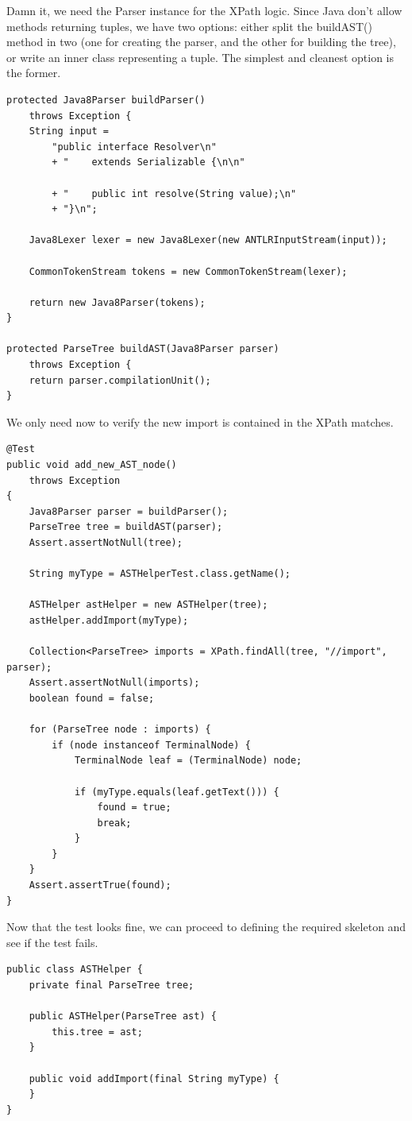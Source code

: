 \documentclass[11pt]{article}
\begin{document}
Damn it, we need the Parser instance for the XPath logic. Since Java don't allow methods returning tuples, we have two options: either split
the buildAST() method in two (one for creating the parser, and the other for building the tree), or write an inner class representing a tuple.
The simplest and cleanest option is the former.

\begin{verbatim}
protected Java8Parser buildParser()
    throws Exception {
    String input =
        "public interface Resolver\n"
        + "    extends Serializable {\n\n"

        + "    public int resolve(String value);\n"
        + "}\n";

    Java8Lexer lexer = new Java8Lexer(new ANTLRInputStream(input));

    CommonTokenStream tokens = new CommonTokenStream(lexer);

    return new Java8Parser(tokens);
}

protected ParseTree buildAST(Java8Parser parser)
    throws Exception {
    return parser.compilationUnit();
}
\end{verbatim}

We only need now to verify the new import is contained in the XPath matches.

\begin{verbatim}
@Test
public void add_new_AST_node()
    throws Exception
{
    Java8Parser parser = buildParser();
    ParseTree tree = buildAST(parser);
    Assert.assertNotNull(tree);

    String myType = ASTHelperTest.class.getName();

    ASTHelper astHelper = new ASTHelper(tree);
    astHelper.addImport(myType);

    Collection<ParseTree> imports = XPath.findAll(tree, "//import", parser);
    Assert.assertNotNull(imports);
    boolean found = false;

    for (ParseTree node : imports) {
        if (node instanceof TerminalNode) {
            TerminalNode leaf = (TerminalNode) node;

            if (myType.equals(leaf.getText())) {
                found = true;
                break;
            }
        }
    }
    Assert.assertTrue(found);
}
\end{verbatim}

Now that the test looks fine, we can proceed to defining the required skeleton and see if the test fails.

\begin{verbatim}
public class ASTHelper {
    private final ParseTree tree;

    public ASTHelper(ParseTree ast) {
        this.tree = ast;
    }

    public void addImport(final String myType) {
    }
}
\end{verbatim}
\end{document}
